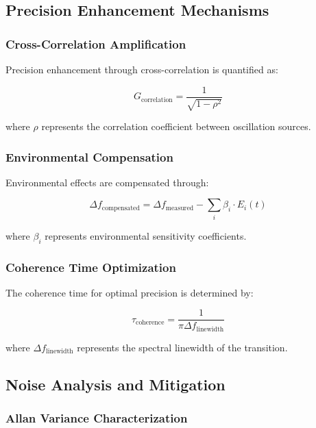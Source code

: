 \documentclass[12pt,a4paper]{article}
\begin{document}
{{{{{{{{{{{{{{\subsection{Precision Enhancement Mechanisms}

\subsubsection{Cross-Correlation Amplification}

Precision enhancement through cross-correlation is quantified as:

\begin{equation}
G_{\text{correlation}} = \frac{1}{\sqrt{1 - \rho^2}}
\end{equation}

where $\rho$ represents the correlation coefficient between oscillation sources.

\subsubsection{Environmental Compensation}

Environmental effects are compensated through:

\begin{equation}
\Delta f_{\text{compensated}} = \Delta f_{\text{measured}} - \sum_{i} \beta_i \cdot E_i(t)
\end{equation}

where $\beta_i$ represents environmental sensitivity coefficients.

\subsubsection{Coherence Time Optimization}

The coherence time for optimal precision is determined by:

\begin{equation}
\tau_{\text{coherence}} = \frac{1}{\pi \Delta f_{\text{linewidth}}}
\end{equation}

where $\Delta f_{\text{linewidth}}$ represents the spectral linewidth of the transition.

\subsection{Noise Analysis and Mitigation}

\subsubsection{Allan Variance Characterization}

}}}}}}}}}}}}}}
\end{document}

